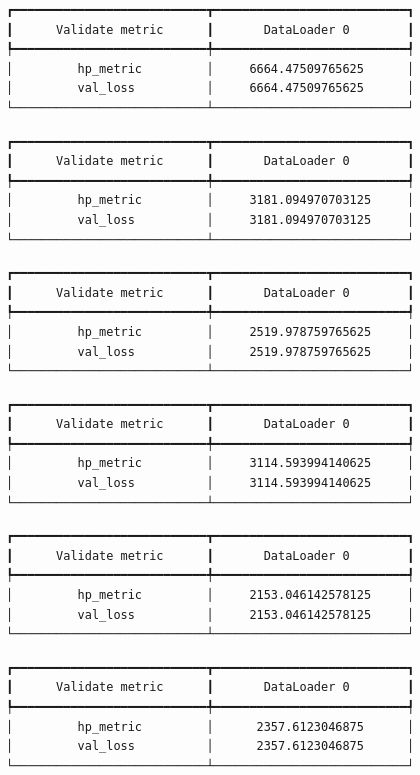 \documentclass[
  letterpaper,
  DIV=11,
  numbers=noendperiod]{scrreprt}
\begin{document}
\begin{verbatim}
┏━━━━━━━━━━━━━━━━━━━━━━━━━━━┳━━━━━━━━━━━━━━━━━━━━━━━━━━━┓
┃      Validate metric      ┃       DataLoader 0        ┃
┡━━━━━━━━━━━━━━━━━━━━━━━━━━━╇━━━━━━━━━━━━━━━━━━━━━━━━━━━┩
│         hp_metric         │     6664.47509765625      │
│         val_loss          │     6664.47509765625      │
└───────────────────────────┴───────────────────────────┘
\end{verbatim}

\begin{verbatim}
┏━━━━━━━━━━━━━━━━━━━━━━━━━━━┳━━━━━━━━━━━━━━━━━━━━━━━━━━━┓
┃      Validate metric      ┃       DataLoader 0        ┃
┡━━━━━━━━━━━━━━━━━━━━━━━━━━━╇━━━━━━━━━━━━━━━━━━━━━━━━━━━┩
│         hp_metric         │     3181.094970703125     │
│         val_loss          │     3181.094970703125     │
└───────────────────────────┴───────────────────────────┘
\end{verbatim}

\begin{verbatim}
┏━━━━━━━━━━━━━━━━━━━━━━━━━━━┳━━━━━━━━━━━━━━━━━━━━━━━━━━━┓
┃      Validate metric      ┃       DataLoader 0        ┃
┡━━━━━━━━━━━━━━━━━━━━━━━━━━━╇━━━━━━━━━━━━━━━━━━━━━━━━━━━┩
│         hp_metric         │     2519.978759765625     │
│         val_loss          │     2519.978759765625     │
└───────────────────────────┴───────────────────────────┘
\end{verbatim}

\begin{verbatim}
┏━━━━━━━━━━━━━━━━━━━━━━━━━━━┳━━━━━━━━━━━━━━━━━━━━━━━━━━━┓
┃      Validate metric      ┃       DataLoader 0        ┃
┡━━━━━━━━━━━━━━━━━━━━━━━━━━━╇━━━━━━━━━━━━━━━━━━━━━━━━━━━┩
│         hp_metric         │     3114.593994140625     │
│         val_loss          │     3114.593994140625     │
└───────────────────────────┴───────────────────────────┘
\end{verbatim}

\begin{verbatim}
┏━━━━━━━━━━━━━━━━━━━━━━━━━━━┳━━━━━━━━━━━━━━━━━━━━━━━━━━━┓
┃      Validate metric      ┃       DataLoader 0        ┃
┡━━━━━━━━━━━━━━━━━━━━━━━━━━━╇━━━━━━━━━━━━━━━━━━━━━━━━━━━┩
│         hp_metric         │     2153.046142578125     │
│         val_loss          │     2153.046142578125     │
└───────────────────────────┴───────────────────────────┘
\end{verbatim}

\begin{verbatim}
┏━━━━━━━━━━━━━━━━━━━━━━━━━━━┳━━━━━━━━━━━━━━━━━━━━━━━━━━━┓
┃      Validate metric      ┃       DataLoader 0        ┃
┡━━━━━━━━━━━━━━━━━━━━━━━━━━━╇━━━━━━━━━━━━━━━━━━━━━━━━━━━┩
│         hp_metric         │      2357.6123046875      │
│         val_loss          │      2357.6123046875      │
└───────────────────────────┴───────────────────────────┘
\end{verbatim}
\end{document}
